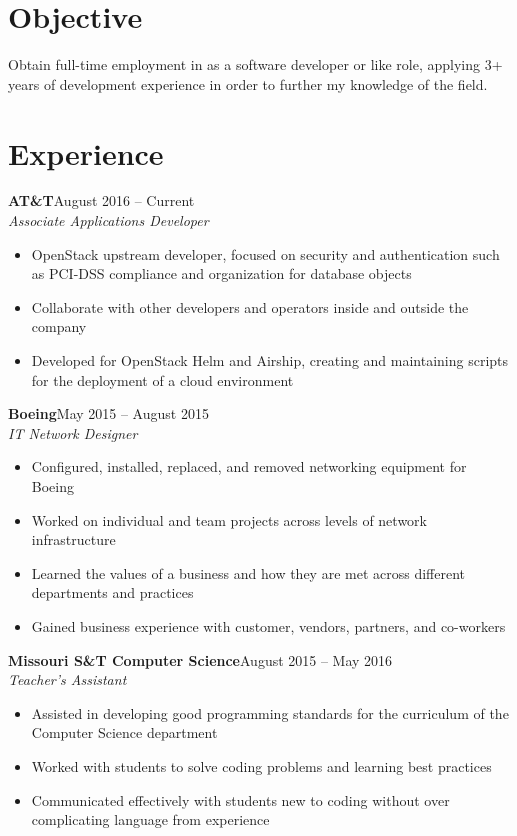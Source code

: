 \documentclass[margin]{res}
\begin{document}
  \begin{resume} 
    \section{Objective} 
      Obtain full-time employment in as a software developer or like role, applying 3+ years of development experience in order to further my knowledge of the field.

	\section{Experience}
	   \textbf{AT\&T}\hfill August 2016 -- Current\\
       \textit{Associate Applications Developer} 
       \begin{itemize} \itemsep -1pt  %
         \item OpenStack upstream developer, focused on security and authentication such as PCI-DSS compliance and organization for database objects
         \item Collaborate with other developers and operators inside and outside the company
         \item Developed for OpenStack Helm and Airship, creating and maintaining scripts for the deployment of a cloud environment
       \end{itemize}
	
       \textbf{Boeing}\hfill May 2015 -- August 2015 \\
       \textit{IT Network Designer}\hfill 
       \begin{itemize} \itemsep -1pt  %
         \item Configured, installed, replaced, and removed networking equipment for Boeing
         \item Worked on individual and team projects across levels of network infrastructure 
         \item Learned the values of a business and how they are met across different departments and practices
         \item Gained business experience with customer, vendors, partners, and co-workers
       \end{itemize}

	   \textbf{Missouri S\&T Computer Science}\hfill August 2015 -- May 2016\\
       \textit{Teacher's Assistant} 
       \begin{itemize} \itemsep -1pt  %
         \item Assisted in developing good programming standards for the curriculum of the Computer Science department
         \item Worked with students to solve coding problems and learning best practices
         \item Communicated effectively with students new to coding without over complicating language from experience
       \end{itemize}


\end{resume}
\end{document}
